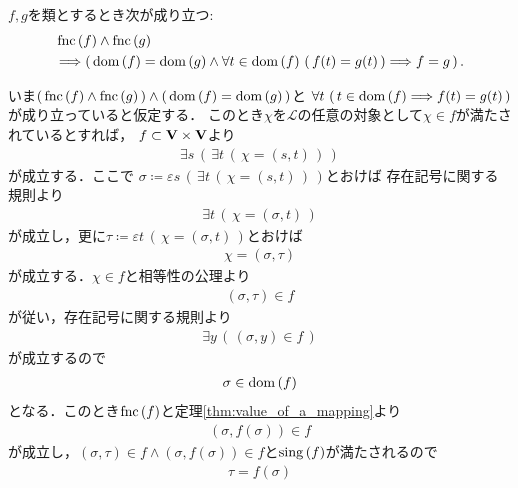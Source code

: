 	\begin{screen}
		\begin{thm}[定義域と値が一致する写像は等しい]
			$f,g$を類とするとき次が成り立つ:
			\begin{align}
				&\operatorname*{fnc} \left(f\right) \wedge \operatorname*{fnc} \left(g\right) \\
				&\Longrightarrow  
				\left(\, \operatorname*{dom} \left(f\right) = \operatorname*{dom} \left(g\right) \wedge
				\forall t \in \operatorname*{dom} \left(f\right)\, \left(\, f(t) = g(t)\, \right) \Longrightarrow f = g\, \right).
			\end{align}
		\end{thm}
	\end{screen}
	
	\begin{prf}
		いま$\left(\, \operatorname*{fnc} \left(f\right) \wedge \operatorname*{fnc} \left(g\right)\, \right) \wedge \left(\, \operatorname*{dom} \left(f\right) = \operatorname*{dom} \left(g\right)\, \right)$と
		$\forall t\, \left(\, t \in \operatorname*{dom} \left(f\right) \Longrightarrow f(t) = g(t)\, \right)$が成り立っていると仮定する．
		このとき$\chi$を$\mathcal{L}$の任意の対象として$\chi \in f$が満たされているとすれば，
		$f \subset \mathbf{V} \times \mathbf{V}$より
		\begin{align}
			\exists s\, \left(\, \exists t\, (\, \chi = (s,t)\, )\, \right)
		\end{align}
		が成立する．ここで
		$\sigma \coloneqq \varepsilon s\, \left(\, \exists t\, (\, \chi = (s,t)\, )\, \right)$とおけば
		存在記号に関する規則より
		\begin{align}
			\exists t\, (\, \chi = (\sigma,t)\, )
		\end{align}
		が成立し，更に$\tau \coloneqq \varepsilon t\, (\, \chi = (\sigma,t)\, )$とおけば
		\begin{align}
			\chi = (\sigma,\tau)
		\end{align}
		が成立する．$\chi \in f$と相等性の公理より
		\begin{align}
			(\sigma,\tau) \in f
		\end{align}
		が従い，存在記号に関する規則より
		\begin{align}
			\exists y\, (\, (\sigma,y) \in f\, )
		\end{align}
		が成立するので
		\begin{align}
			\sigma \in \operatorname*{dom} \left(f\right)
		\end{align}
		となる．このとき$\operatorname*{fnc} \left(f\right)$と定理\ref{thm:value_of_a_mapping}より
		\begin{align}
			(\sigma,f(\sigma)) \in f
		\end{align}
		が成立し，$(\sigma,\tau) \in f \wedge (\sigma,f(\sigma)) \in f$と$\operatorname*{sing} \left(f\right)$が満たされるので
		\begin{align}
			\tau = f(\sigma)

\end{align}
\end{prf}
